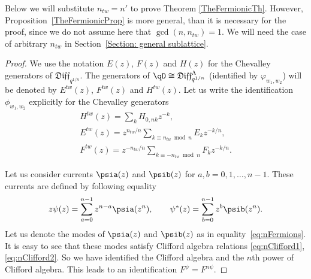 \begin{Remark}
Below we will substitute $n_{tw}=n'$ to prove Theorem \ref{TheFermionicTh}. However, Proposi\-tion~\ref{TheFermionicProp} is more general, than it is necessary for the proof, since we do not assume here that $\gcd(n, n_{tw})=1$. We will need the case of arbitrary $n_{tw}$ in Section~\ref{Section: general sublattice}.
\end{Remark}

\begin{proof}
We use the notation $E(z)$, $F(z)$ and $H(z)$ for the Chevalley generators of $\mathfrak{Diff}_{q^{1/n}}$. The generators of $\qD \cong \mathfrak{Diff}_{q^{1/n}}^{\Lambda}$ (identified by $\varphi_{w_1,w_2}$) will be denoted by $E^{tw}(z)$, $F^{tw}(z)$ and $H^{tw} (z)$. Let us write the identification $\phi_{w_1,w_2}$ explicitly for the Chevalley generators
\begin{gather}
H^{tw}(z) = \sum_k H_{ 0, nk} z^{-k}, \label{eq: tw chevalleyH}\\
E^{tw}(z) = z^{n_{tw}/n} \sum_{k \equiv n_{tw} \bmod n} E_{k} z^{-k/n}, \\
F^{tw}(z) = z^{-n_{tw}/n} \sum_{k \equiv -n_{tw} \bmod n} F_{ k} z^{-k/n} .\label{eq: tw chevalleyF}
\end{gather}

Let us consider currents $\psia (z)$ and $\psib (z)$ for $a,b = 0, 1, \dots, n-1$. These currents are defined by following equality
\begin{gather}
z \psi(z) = \sum_{a=0}^{n-1} z^{n-a} \psia (z^n) , \qquad
\psi^*(z) = \sum_{b=0}^{n-1} z^{b} \psib (z^n).\label{defa1}
\end{gather}
Let us denote the modes of $\psia (z)$ and $\psib (z)$ as in equality~\eqref{eq:nFermions}. It is easy to see that these modes satisfy Clifford algebra relations \eqref{eq:nClifford1}, \eqref{eq:nClifford2}. So we have identified the Clifford algebra and the $n$th power of Clifford algebra. This leads to an identification $F^{\psi}=F^{n \psi}$.


\end{proof}
